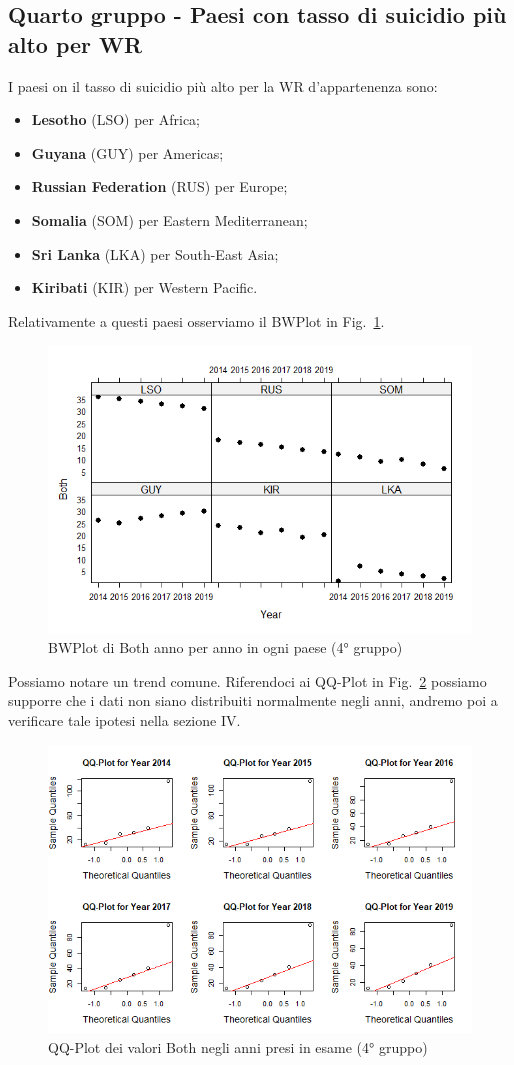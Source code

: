\documentclass[conference]{IEEEtran}
\begin{document}
\subsection{Quarto gruppo - Paesi con tasso di suicidio più alto per WR}

I paesi on il tasso di suicidio più alto per la
WR d'appartenenza sono:
\begin{itemize}
    \item \textbf{Lesotho} (LSO) per Africa;
    \item \textbf{Guyana} (GUY) per Americas;
    \item \textbf{Russian Federation} (RUS) per Europe;
    \item \textbf{Somalia} (SOM) per Eastern Mediterranean;
    \item \textbf{Sri Lanka} (LKA) per South-East Asia;
    \item \textbf{Kiribati} (KIR) per Western Pacific. 
\end{itemize}
Relativamente a questi paesi osserviamo il BWPlot in Fig.~\ref{11fourthgroup}.
\begin{figure}[htbp]
    \centerline{\includegraphics[width=.5\textwidth]{img/11 - Fourthgroup.png}}
    \caption{BWPlot di Both anno per anno in ogni paese (4° gruppo)}
    \label{11fourthgroup}
\end{figure}
Possiamo notare un trend comune.
Riferendoci ai QQ-Plot in Fig.~\ref{12fourthqq} possiamo supporre che i dati non siano
distribuiti normalmente negli anni, andremo poi a verificare tale ipotesi nella sezione IV.
\begin{figure}[htbp]
    \centerline{\includegraphics[width=.5\textwidth]{img/12 - Fourthqq.png}}
    \caption{QQ-Plot dei valori Both negli anni presi in esame (4° gruppo)}
    \label{12fourthqq}
\end{figure}
\end{document}
